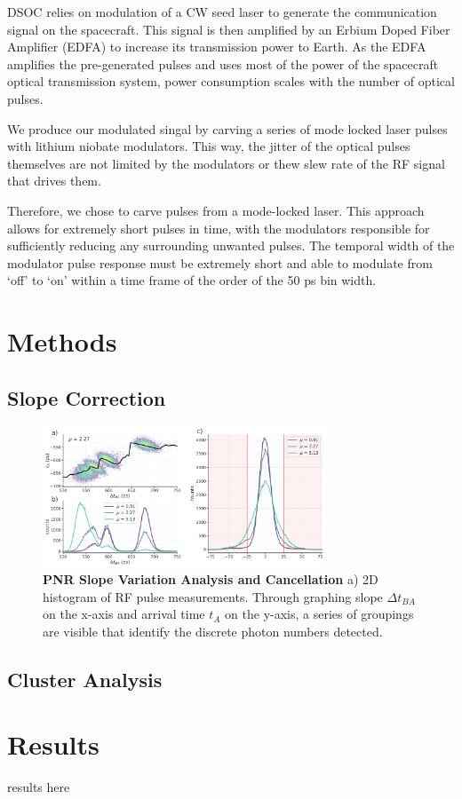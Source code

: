 \documentclass{optica-article}
\begin{document}
DSOC relies on modulation of a CW seed laser to generate the communication signal on the spacecraft. This signal is then amplified by an Erbium Doped Fiber Amplifier (EDFA) to increase its transmission power to Earth. As the EDFA amplifies the pre-generated pulses and uses most of the power of the spacecraft optical transmission system, power consumption scales with the number of optical pulses.

We produce our modulated singal by carving a series of mode locked laser pulses with lithium niobate modulators. This way, the jitter of the optical pulses themselves are not limited by the modulators or thew slew rate of the RF signal that drives them.

Therefore, we chose to carve pulses from a mode-locked laser. This approach allows for extremely short pulses in time, with the modulators responsible for sufficiently reducing any surrounding unwanted pulses. The temporal width of the modulator pulse response must be extremely short and able to modulate from `off' to `on' within a time frame of the order of the 50 ps bin width.

\hypertarget{methods}{%
\section{Methods}\label{methods}}

\hypertarget{slope-correction}{%
\subsection{Slope Correction}\label{slope-correction}}

\hypertarget{fig:slope-correction}{%
\begin{figure}
\centering
\includegraphics[width=0.75\textwidth]{./figs_03/slope_cancellation_light.pdf}
\caption[{PNR Slope Variation Analysis and Cancellation}]{\textbf{PNR Slope Variation Analysis and Cancellation} a) 2D histogram of RF pulse measurements. Through graphing slope $\Delta t_{BA}$ on the x-axis and arrival time $t_A$ on the y-axis, a series of groupings are visible that identify the discrete photon numbers detected.}
\label{fig:slope-correction}
\end{figure}
}

\hypertarget{cluster-analysis}{%
\subsection{Cluster Analysis}\label{cluster-analysis}}

\hypertarget{results}{%
\section{Results}\label{results}}

results here


\end{document}
